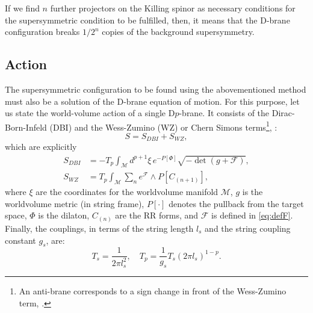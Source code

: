 If we find $n$ further projectors on the Killing spinor as necessary conditions for the supersymmetric condition to be fulfilled, then, it means that the D-brane configuration breaks $1/2^n$ copies of the background supersymmetry. 







\subsection{Action}
The supersymmetric configuration to be found using the abovementioned method must also be a solution of the D-brane equation of motion. For this purpose, let us state the world-volume action of a single D$p$-brane. It consists of the Dirac-Born-Infeld (DBI) and the Wess-Zumino (WZ) or Chern Simons terms\footnote{An anti-brane corresponds to a sign change in front of the Wess-Zumino term, \cite{Kruczenski:2003be}.},
\cite{Ammon:2015wua}:
\begin{equation} \label{eq:DbraneAction}
 S = S_{DBI} + S_{WZ},
\end{equation}
which are explicitly
\begin{align}
 S_{DBI} & = 
 -T_p \int_\mathcal{M} d^{p+1}\xi \, e^{-P[\Phi] } \sqrt{-\det (g+\mathcal{F})},\\
 S_{WZ} & =
 T_p\int _\mathcal{M} \sum_n e^{\mathcal{F}}\wedge P[C_{(n+1)}],
\end{align}
where $\xi$ are the coordinates for the worldvolume manifold $\mathcal{M}$, $g$ is the worldvolume metric (in string frame), $P[\cdot]$ denotes the pullback from the target space, $\Phi$ is the dilaton, $C_{(n)}$ are the RR forms, and $\mathcal{F}$ is defined in \eqref{eq:defF}. Finally, the couplings, in terms of the string length $l_s$ and the string coupling constant $g_s$, are:
\begin{equation}
 T_{s} = \dfrac{1}{2\pi l_s^2}, \quad T_p = \dfrac{1}{g_s} T_s (2\pi l_s)^{1-p}.
\end{equation}
















